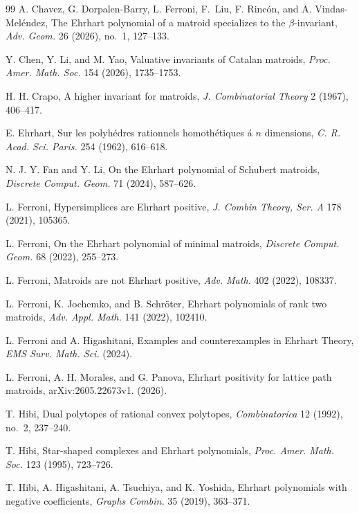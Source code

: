 \documentclass[reqno, 12pt]{article}
\numberwithin{equation}{section}
\theoremstyle{definition}
\begin{document}
\begin{thebibliography}{99}
 A. Chavez, G. Dorpalen-Barry, L. Ferroni, F.~Liu, F. Rinc{\'o}n, and A. Vindas-Mel{\'e}ndez, The Ehrhart
  polynomial of a matroid specializes to the $\beta$-invariant, \emph{Adv. Geom.} 26 (2026), no.~1, 127--133.

 Y. Chen, Y. Li, and M. Yao, Valuative invariants of Catalan matroids, \emph{Proc. Amer. Math. Soc.} 154 (2026), 1735--1753.

 H. H. Crapo, A higher invariant for matroids, \emph{J. Combinatorial Theory} 2 (1967), 406--417.

 E. Ehrhart, Sur les polyh\'edres rationnels homoth\'etiques \'a $n$ dimensions, \emph{C. R. Acad. Sci. Paris.} 254 (1962), 616--618.


 N. J. Y. Fan and Y. Li, On the Ehrhart polynomial of Schubert matroids, \emph{Discrete Comput. Geom.} 71 (2024), 587--626.

 L. Ferroni, Hypersimplices are Ehrhart positive, \emph{J. Combin Theory, Ser. A} 178 (2021), 105365.

 L. Ferroni, On the Ehrhart polynomial of minimal matroids, \emph{Discrete Comput. Geom.} 68 (2022), 255--273.

 L. Ferroni, Matroids are not Ehrhart positive, \emph{Adv. Math.} 402 (2022), 108337.

 L. Ferroni, K. Jochemko, and B. Schr\"oter, Ehrhart polynomials of rank two matroids, \emph{Adv. Appl. Math.} 141 (2022), 102410.

 L. Ferroni and A. Higashitani, Examples and counterexamples in Ehrhart Theory, \emph{EMS Surv. Math. Sci.} (2024).

 L. Ferroni, A. H. Morales, and G. Panova, Ehrhart positivity for lattice path matroids, arXiv:2605.22673v1. (2026).

 T. Hibi, Dual polytopes of rational convex polytopes, \emph{Combinatorica} 12 (1992), no.~2, 237--240.

 T. Hibi, Star-shaped complexes and Ehrhart polynomials, \emph{Proc. Amer. Math. Soc.} 123 (1995), 723--726.

 T. Hibi, A. Higashitani, A. Tsuchiya, and K. Yoshida, Ehrhart polynomials with negative coefficients, \emph{Graphs Combin.} 35 (2019), 363--371.


\end{thebibliography}
\end{document}
